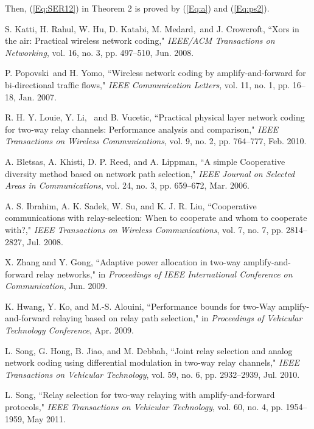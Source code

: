 \documentclass[onecolumn,letterpaper,11pt,draftclsnofoot]{IEEEtran}
\begin{document}
Then, (\ref{Eq:SER12}) in Theorem 2 is proved by (\ref{Eq:a}) and
(\ref{Eq:ps2}).

\begin{thebibliography}{1}

S. Katti, H. Rahul, W. Hu, D. Katabi, M. Medard,~and
J. Crowcroft, ``Xors in the air: Practical wireless network coding,"
\emph{IEEE/ACM Transactions on Networking}, vol. 16, no. 3, pp.
497--510, Jun. 2008.

P. Popovski~and H. Yomo, ``Wireless network coding by
amplify-and-forward for bi-directional traffic flows," \emph{IEEE
Communication Letters}, vol. 11, no. 1, pp. 16--18, Jan. 2007.

 R. H. Y. Louie, Y. Li,~ and B. Vucetic, ``Practical physical layer network
coding for two-way relay channels: Performance analysis and
comparison," \emph{IEEE Transactions on Wireless Communications},
vol. 9, no. 2, pp. 764--777, Feb. 2010.

A. Bletsas, A. Khisti, D. P. Reed, and A. Lippman, ``A simple
Cooperative diversity method based on network path selection,"
\emph{IEEE Journal on Selected Areas in Communications}, vol. 24,
no. 3, pp. 659--672, Mar. 2006.

A. S. Ibrahim, A. K. Sadek, W. Su, and K. J. R. Liu, ``Cooperative communications with relay-selection: When to cooperate
and whom to cooperate with?," \emph{IEEE Transactions on Wireless
Communications}, vol. 7, no. 7, pp. 2814--2827, Jul. 2008.

 X. Zhang and Y. Gong, ``Adaptive power allocation in two-way amplify-and-forward relay
networks," in \emph{Proceedings of IEEE International Conference on
Communication}, Jun. 2009.

K. Hwang, Y. Ko, and M.-S. Alouini, ``Performance
bounds for two-Way amplify-and-forward relaying based on relay path
selection," in \emph{Proceedings of Vehicular Technology
Conference}, Apr. 2009.

 L. Song, G. Hong, B. Jiao, and M. Debbah, ``Joint relay selection and analog network coding using differential modulation in two-way relay channels,"
\emph{IEEE Transactions on Vehicular Technology}, vol. 59, no. 6,
pp. 2932--2939, Jul. 2010.

 L. Song, ``Relay selection for two-way relaying with
amplify-and-forward protocols," \emph{IEEE Transactions on Vehicular
Technology}, vol. 60, no. 4, pp. 1954--1959, May 2011.


\end{thebibliography}
\end{document}
